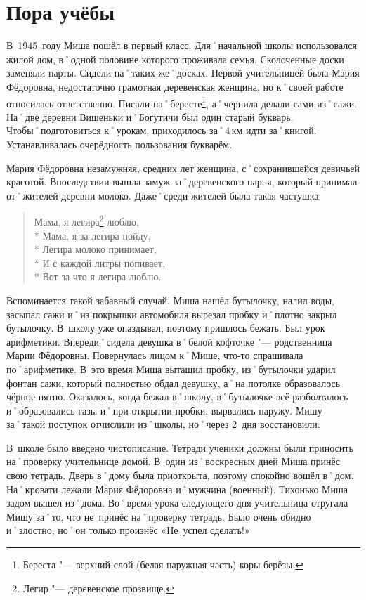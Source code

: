 ﻿\chapter{Пора учёбы}
В~1945~году Миша пошёл в первый класс. Для˚начальной школы использовался жилой дом, в˚одной половине которого проживала семья. Сколоченные доски заменяли парты. Сидели на˚таких же˚досках. Первой учительницей была Мария Фёдоровна, недостаточно грамотная деревенская женщина, но к˚своей работе относилась ответственно. Писали на˚бересте\footnote{Береста "--- верхний слой (белая наружная часть) коры берёзы.}, а˚чернила делали сами из˚сажи. На˚две деревни Вишеньки и˚Богутичи был один старый букварь. Чтобы˚подготовиться к˚урокам, приходилось за˚4\,км идти за˚книгой. Устанавливалась очерёдность пользования букварём.

Мария Фёдоровна незамужняя, средних лет женщина, с˚сохранившейся девичьей красотой. Впоследствии вышла замуж за˚деревенского парня, который принимал от˚жителей деревни молоко. Даже˚среди жителей была такая частушка:

\begin{verse}
	Мама, я легира\footnote{Легир "--- деревенское прозвище.} люблю, \\* 
	Мама, я за легира пойду, \\*	
	Легира молоко принимает, \\*
	И с каждой литры попивает, \\*
	Вот за что я легира люблю. 
\end{verse}

Вспоминается такой забавный случай. Миша нашёл бутылочку, налил воды, засыпал сажи и˚из покрышки автомобиля вырезал пробку и˚плотно закрыл бутылочку. В~школу уже опаздывал, поэтому пришлось бежать. Был урок арифметики. Впереди˚сидела девушка в˚белой кофточке "--- родственница Марии Фёдоровны. Повернулась лицом к˚Мише, что-то спрашивала по˚арифметике. В~это время Миша вытащил пробку, из˚бутылочки ударил фонтан сажи, который полностью обдал девушку, а˚на потолке образовалось чёрное пятно. Оказалось, когда бежал в˚школу, в˚бутылочке всё разболталось и˚образовались газы и˚при открытии пробки, вырвались наружу. Мишу за˚такой поступок отчислили из˚школы, но˚через 2~дня восстановили.

В~школе было введено чистописание. Тетради ученики должны были приносить на˚проверку учительнице домой. В~один из˚воскресных дней Миша принёс свою тетрадь. Дверь в˚дому была приоткрыта, поэтому спокойно вошёл в˚дом. На˚кровати лежали Мария Фёдоровна и˚мужчина (военный). Тихонько Миша задом вышел из˚дома. Во˚время урока следующего дня учительница отругала Мишу за˚то, что не~принёс на˚проверку тетрадь. Было очень обидно и˚злостно, но˚он только произнёс «Не~успел сделать!» 

